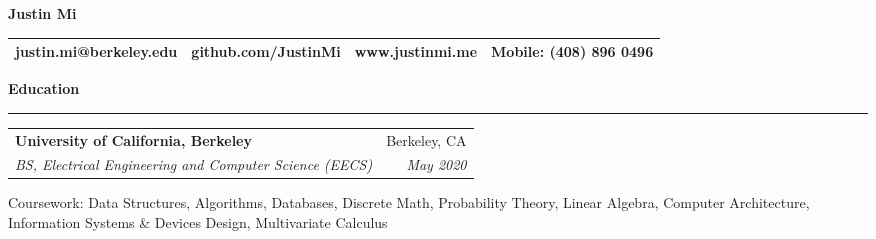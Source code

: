 \documentclass[11pt,letterpaper]{article}
\makeatletter
\newenvironment{topic}[1]
    {
    {\Large \centerline{#1}}
    \vspace*{0.03in}
    \hrule 
    \vspace*{0.05in}
    }
    {}
\newenvironment{event}
    {
    \begin{tabular*}{\textwidth}{l@{\extracolsep{\fill}}r}
    }
    {
    \end{tabular*}
    }
\newenvironment{detail}
    {
    \normalsize
    }
    {
    \vspace*{0.02in}
    }
\newenvironment{head}
    {
    \begin{center}
    \begin{tabular*}{\textwidth}{@{\extracolsep{\fill}} l c c r}
    }
    {
    \hline
    \hline
    \end{tabular*}
    \end{center}
    }
\makeatother
\begin{document}
    \begin{center}
        \huge{\textbf{Justin Mi}}
    \end{center}
    \begin{head}
    justin.mi@berkeley.edu  & github.com/JustinMi & www.justinmi.me & Mobile: (408) 896 0496 \\
    \end{head}








    \begin{topic}{\textbf{Education}}
        \begin{event}
            \textbf{University of California, Berkeley} & Berkeley, CA \\
            \emph{BS, Electrical Engineering and Computer Science (EECS)} & \emph{May 2020}        
        \end{event}
            \begin{detail}
                Coursework: Data Structures, Algorithms, Databases, Discrete Math, Probability Theory, Linear Algebra, Computer Architecture, Information Systems \& Devices Design, Multivariate Calculus            
            \end{detail}
    \end{topic} \vspace*{0.1in}
\end{document}
